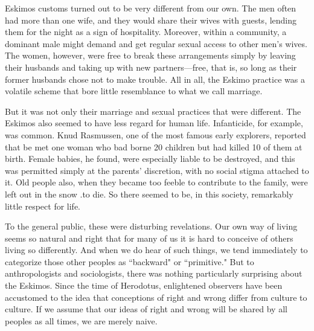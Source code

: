 Eskimos customs turned out to be very different from our own. The men 
often  had  more  than  one  wife,  and  they  would  share  their  wives  with 
guests,  lending  them  for  the  night  as  a  sign  of  hospitality.  Moreover, 
within  a  community,  a  dominant  male  might  demand  and  get  regular 
sexual access to other men's wives. The women, however, were free to 
break  these  arrangements  simply  by  leaving  their  husbands  and  taking 
up  with  new  partners—free,  that  is,  so  long  as  their  former  husbands  
chose  not  to  make  trouble.  All  in  all,  the  Eskimo  practice  was  a  volatile 
scheme that bore little resemblance to what we call marriage. 

But  it  was  not only  their  marriage  and sexual  practices  that  were 
different.  The  Eskimos also  seemed  to  have less  regard for  human  life. 
Infanticide,  for  example,  was  common.  Knud  Rasmussen,  one  of  the 
most famous early explorers, reported that be met one woman who bad 
borne  20  children  but had  killed  10  of  them  at  birth.  Female  babies,  he 
found,  were  especially  liable  to  be  destroyed,  and  this  was  permitted 
simply at the parents' discretion, with no social stigma attached to it. Old 
people  also,  when  they  became  too  feeble  to  contribute  to  the  family, 
were left out in the snow .to die. So there seemed to be, in this society, 
remarkably little respect for life. 

To the general public, these were disturbing revelations. Our own way of 
living  seems  so  natural  and  right  that  for  many  of  us  it  is  hard  to 
conceive of  others  living  so  differently.  And  when  we  do  hear  of  such 
things, we tend immediately to categorize those other peoples as 
``backward"  or  ``primitive."  But  to  anthropologists  and  sociologists,  there 
was nothing particularly surprising about the Eskimos. Since the time of 
Herodotus,  enlightened  observers  have  been  accustomed  to  the  idea 
that  conceptions  of  right  and  wrong  differ  from  culture  to  culture.  If  we 
assume that our ideas of right and wrong will be shared by all peoples as 
all times, we are merely naive.

